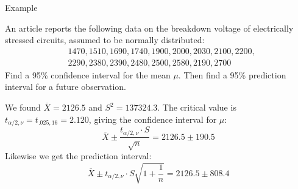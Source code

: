 \documentclass[t,handout]{beamer}
\begin{document}
    \begin{frame}{Example}
    \begin{block}{}
    An article reports the following data on the breakdown voltage of electrically stressed circuits, assumed to be normally distributed:
    \begin{align*}
    &1470, 1510, 1690, 1740, 1900, 2000, 2030, 2100, 2200, \\
    & 2290, 2380, 2390, 2480, 2500, 2580, 2190, 2700
    \end{align*}
    Find a 95\% confidence interval for the mean $\mu$. Then find a 95\% prediction interval for a future observation.
    \end{block}
    
    We found $\overline X=2126.5$ and $S^2=137324.3$.
    The critical value is $t_{\alpha/2,\nu}=t_{.025,16}=2.120$, giving the confidence interval for $\mu$:
    $$\overline{X} \pm \frac{t_{\alpha/2,\nu}\cdot S}{\sqrt{n}} = 2126.5 \pm 190.5$$
    Likewise we get the prediction interval:
    $$\overline X \pm t_{\alpha/2,\nu}\cdot S\sqrt{1+\frac1n} = 2126.5 \pm 808.4$$
    \end{frame}
\end{document}
